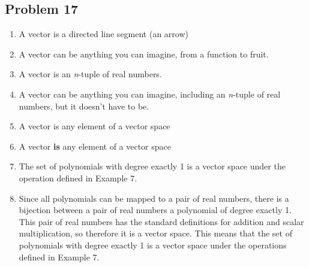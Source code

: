\documentclass{article}
\newcommand{\bld}{\textbf}
\newcommand{\itl}{\textit}
\newcommand{\bitem}[1]{\item[\bld{#1.}]}
\begin{document}
\subsection*{Problem 17}
\begin{enumerate}
  \bitem{a} A vector is a directed line segment (an arrow)
  \item[] A vector can be anything you can imagine, from a function to fruit.
    \bitem{b} A vector is an \itl{n}-tuple of real numbers.
  \item[] A vector can be anything you can imagine, including an \itl{n}-tuple of real numbers, but it doesn't have to be.
    \bitem{c} A vector is any element of a vector space
  \item[] A vector \bld{is} any element of a vector space
    \bitem{e} The set of polynomials with degree exactly 1 is a vector space under the operation defined in Example 7.\
  \item[] Since all polynomials can be mapped to a pair of real numbers, there is a bijection between a pair of real numbers
    a polynomial of degree exactly 1. This pair of real numbers has the standard definitions for addition and scalar multiplication,
    so therefore it is a vector space. This means that the set of polynomials with degree exactly 1 is a vector space under the
    operations defined in Example 7.
\end{enumerate}
\end{document}
